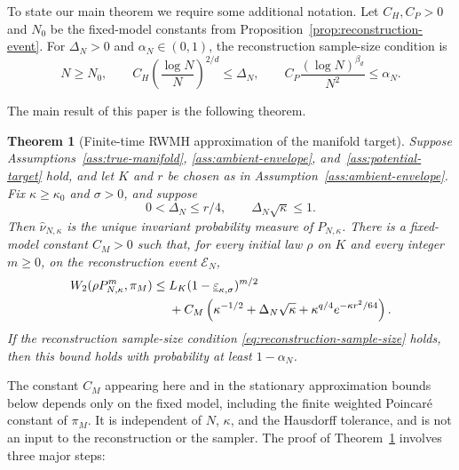\documentclass{article}
\newtheorem{theorem}{Theorem}
\newcommand{\cE}{\mathcal E}
\newcommand{\whatnu}{\widehat\nu_{N,\kappa}}
\numberwithin{equation}{section}
\begin{document}
To state our main theorem we require some additional notation. Let $C_H,C_P>0$ and $N_0$ be the
fixed-model constants from Proposition~\ref{prop:reconstruction-event}.
For $\Delta_N>0$ and $\alpha_N\in(0,1)$, the reconstruction sample-size
condition is
\begin{equation}
 N\ge N_0,
 \qquad
 C_H\left(\frac{\log N}{N}\right)^{2/d}\le\Delta_N,
 \qquad
 C_P\frac{(\log N)^{\beta_d}}{N^2}\le\alpha_N.
\label{eq:reconstruction-sample-size}
\end{equation}

The main result of this paper is the following theorem.

\begin{theorem}[Finite-time RWMH approximation of the manifold target]
\label{thm:rwmh-end-to-end}
Suppose Assumptions~\ref{ass:true-manifold},
\ref{ass:ambient-envelope}, and~\ref{ass:potential-target} hold, and let
$K$ and $r$ be chosen as in Assumption~\ref{ass:ambient-envelope}. Fix $\kappa\ge\kappa_0$ and $\sigma>0$,
and suppose
\[
 0<\Delta_N\le r/4,
 \qquad
 \Delta_N\sqrt\kappa\le1.
\]
Then $\whatnu$ is the unique invariant probability measure of
$P_{N,\kappa}$. There is a fixed-model constant $C_M>0$ such that,
for every initial law $\rho$ on $K$ and every integer $m\ge0$,
on the reconstruction event $\cE_N$,
\begin{align}
 W_2(\rho P_{N,\kappa}^m,\pi_M)
 \le{}&L_K(1-\underline\varepsilon_{\kappa,\sigma})^{m/2}
 \notag\\
 &+C_M\left(
 \kappa^{-1/2}+\Delta_N\sqrt\kappa
 +\kappa^{q/4}e^{-\kappa r^2/64}
 \right).
\label{eq:rwmh-end-to-end}
\end{align}
If the reconstruction sample-size condition
\eqref{eq:reconstruction-sample-size} holds, then this bound holds with
probability at least $1-\alpha_N$.
\end{theorem}
The constant $C_M$ appearing here and in the stationary approximation bounds
below depends only on the fixed model, including the finite weighted
Poincar\'e constant of $\pi_M$. It is independent of $N$, $\kappa$, and the
Hausdorff tolerance, and is not an input to the reconstruction or the sampler.
The proof of Theorem~\ref{thm:rwmh-end-to-end} involves three major steps:
\end{document}

